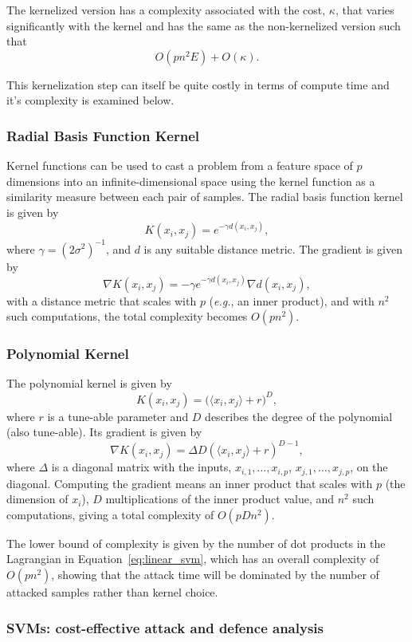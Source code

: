 \documentclass[fonts]{icst}
\begin{document}
The kernelized version has a complexity associated with the cost, $\kappa$, that varies significantly with the kernel and has the same  as the non-kernelized version such that
$$
    O(pn^2 E) + O(\kappa).
$$

This kernelization step can itself be quite costly in terms of compute time and it's complexity is examined below.

\subsubsection{Radial Basis Function Kernel}

Kernel functions can be used to cast a problem from a feature space of $p$ dimensions into an infinite-dimensional space using the kernel function as a similarity measure between each pair of samples.
The radial basis function kernel is given by
$$
    K(x_i, x_j) = e^{-\gamma d(x_i, x_j)},
$$
where $\gamma = {(2 \sigma^2)}^{-1}$, and $d$ is any suitable distance metric.
The gradient is given by
$$
    \nabla K(x_i, x_j) = - \gamma e^{-\gamma d( x_i, x_j )} \nabla d(x_i, x_j),
$$
with a distance metric that scales with $p$ (\textit{e.g.}, an inner product), and with $n^2$ such computations, the total complexity becomes $O(pn^2)$.

\subsubsection{Polynomial Kernel}

The polynomial kernel is given by
$$
    K(x_i, x_j) = {\big(\langle x_i, x_j \rangle + r \big)}^D,
$$
where $r$ is a tune-able parameter and $D$ describes the degree of the polynomial (also tune-able).
Its gradient is given by
$$
    \nabla K(x_i, x_j) = \Delta D{(\langle x_i, x_j \rangle + r)}^{D-1},
$$
where $\Delta$ is a diagonal matrix with the inputs, $x_{i,1},\ldots,x_{i,p}$, $x_{j,1},\ldots,x_{j,p}$, on the diagonal.
Computing the gradient means an inner product that scales with $p$ (the dimension of $x_i$), $D$ multiplications of the inner product value, and $n^2$ such computations, giving a total complexity of $O(pDn^2)$.

The lower bound of complexity is given by the number of dot products in the Lagrangian in Equation~\ref{eq:linear_svm}, which has an overall complexity of $O(pn^2)$, showing that the attack time will be dominated by the number of attacked samples rather than kernel choice.


\subsubsection{SVMs: cost-effective attack and defence analysis}
\label{model}
\end{document}
